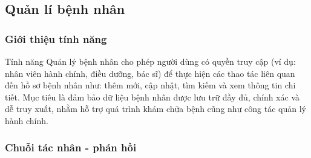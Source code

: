\subsection{Quản lí bệnh nhân}
\subsubsection{Giới thiệu tính năng}
Tính năng Quản lý bệnh nhân cho phép người dùng có quyền truy cập (ví dụ: nhân viên hành chính, điều dưỡng, bác sĩ) để thực hiện các thao tác liên quan đến hồ sơ bệnh nhân như: thêm mới, cập nhật, tìm kiếm và xem thông tin chi tiết.
Mục tiêu là đảm bảo dữ liệu bệnh nhân được lưu trữ đầy đủ, chính xác và dễ truy xuất, nhằm hỗ trợ quá trình khám chữa bệnh cũng như công tác quản lý hành chính.

\subsubsection{Chuỗi tác nhân - phán hồi}